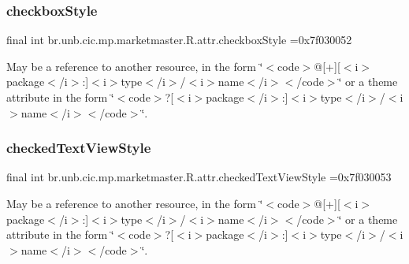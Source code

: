 \subsubsection{\texorpdfstring{checkbox\+Style}{checkboxStyle}}
{\footnotesize\ttfamily final int br.\+unb.\+cic.\+mp.\+marketmaster.\+R.\+attr.\+checkbox\+Style =0x7f030052\hspace{0.3cm}{\ttfamily [static]}}

May be a reference to another resource, in the form \char`\"{}$<$code$>$@\mbox{[}+\mbox{]}\mbox{[}$<$i$>$package$<$/i$>$\+:\mbox{]}$<$i$>$type$<$/i$>$/$<$i$>$name$<$/i$>$$<$/code$>$\char`\"{} or a theme attribute in the form \char`\"{}$<$code$>$?\mbox{[}$<$i$>$package$<$/i$>$\+:\mbox{]}$<$i$>$type$<$/i$>$/$<$i$>$name$<$/i$>$$<$/code$>$\char`\"{}. \mbox{\label{classbr_1_1unb_1_1cic_1_1mp_1_1marketmaster_1_1R_1_1attr_add4ac49da002932047ad03dd7db92f99}} 
\subsubsection{\texorpdfstring{checked\+Text\+View\+Style}{checkedTextViewStyle}}
{\footnotesize\ttfamily final int br.\+unb.\+cic.\+mp.\+marketmaster.\+R.\+attr.\+checked\+Text\+View\+Style =0x7f030053\hspace{0.3cm}{\ttfamily [static]}}

May be a reference to another resource, in the form \char`\"{}$<$code$>$@\mbox{[}+\mbox{]}\mbox{[}$<$i$>$package$<$/i$>$\+:\mbox{]}$<$i$>$type$<$/i$>$/$<$i$>$name$<$/i$>$$<$/code$>$\char`\"{} or a theme attribute in the form \char`\"{}$<$code$>$?\mbox{[}$<$i$>$package$<$/i$>$\+:\mbox{]}$<$i$>$type$<$/i$>$/$<$i$>$name$<$/i$>$$<$/code$>$\char`\"{}. \mbox{\label{classbr_1_1unb_1_1cic_1_1mp_1_1marketmaster_1_1R_1_1attr_a69dc8d296c849c935f967d7e34b4f9ee}} 
